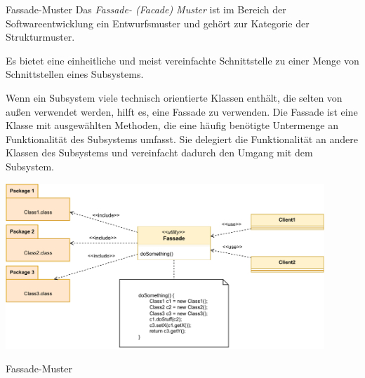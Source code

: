 \begin{defi}{Fassade-Muster}
    Das \emph{Fassade- (Facade) Muster} ist im Bereich der Softwareentwicklung ein Entwurfsmuster und gehört zur Kategorie der Strukturmuster.

    Es bietet eine einheitliche und meist vereinfachte Schnittstelle zu einer Menge von Schnittstellen eines Subsystems.

    Wenn ein Subsystem viele technisch orientierte Klassen enthält, die selten von außen verwendet werden, hilft es, eine Fassade zu verwenden. Die Fassade ist eine Klasse mit ausgewählten Methoden, die eine häufig benötigte Untermenge an Funktionalität des Subsystems umfasst. Sie delegiert die Funktionalität an andere Klassen des Subsystems und vereinfacht dadurch den Umgang mit dem Subsystem.

    \begin{center}
        \includegraphics[width=0.9\textwidth]{includes/figures/defi_fassade.pdf}
    \end{center}
\end{defi}

\begin{example}{Fassade-Muster}

    

    

    
\end{example}

